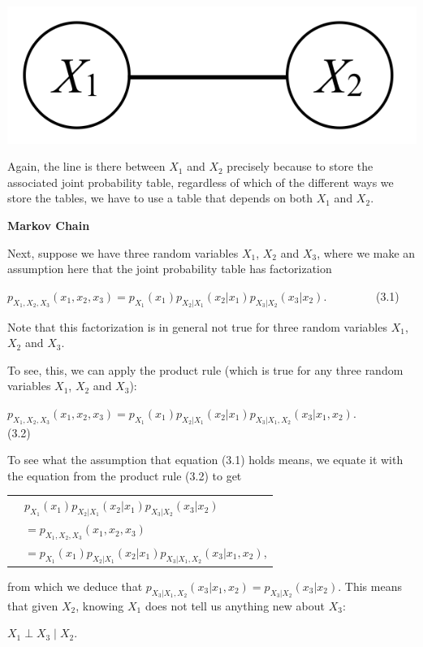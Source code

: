 \documentclass[6008notes.tex]{subfiles}
\begin{document}
{\centering\includegraphics[scale=0.4]{images_sec-graphical-models-2-rv-possibly-dependent} \par}

Again, the line is there between $X_1$ and $X_2$ precisely because to store the associated joint probability table, regardless of which of the different ways we store the tables, we have to use a table that depends on both $X_1$ and $X_2$.

\textbf{Markov Chain}

Next, suppose we have three random variables $X_1$, $X_2$ and $X_3$, where we make an assumption here that the joint probability table has factorization
{\centering$p_{X_1,X_2,X_3}(x_1,x_2,x_3) = p_{X_1}(x_1) p_{X_2|X_1}(x_2|x_1) p_{X_3|X_2}(x_3|x_2). \qquad \qquad$ (3.1) \par}

Note that this factorization is in general not true for three random variables $X_1$, $X_2$ and $X_3$.

To see, this, we can apply the product rule (which is true for any three random variables $X_1$, $X_2$ and $X_3$):
{\centering$p_{X_1,X_2,X_3}(x_1,x_2,x_3) = p_{X_1}(x_1) p_{X_2|X_1}(x_2|x_1) p_{X_3|X_1, X_2}(x_3|x_1, x_2). \qquad \qquad$ (3.2) \par}

To see what the assumption that equation (3.1) holds means, we equate it with the equation from the product rule (3.2) to get

{\renewcommand{\arraystretch}{1.5}
\begin{tabular}{l l}
 & $p_{X_1}(x_1) p_{X_2|X_1}(x_2|x_1) p_{X_3|X_2}(x_3|x_2)$ \\ 
 & $= p_{X_1,X_2,X_3}(x_1,x_2,x_3)$ \\
 & $= p_{X_1}(x_1) p_{X_2|X_1}(x_2|x_1) p_{X_3|X_1, X_2}(x_3|x_1, x_2)$,	 
\end{tabular}}
				
from which we deduce that $p_{X_3|X_1,X_2}(x_3|x_1,x_2)=p_{X_3|X_2}(x_3|x_2)$. This means that given $X_2$, knowing $X_1$ does not tell us anything new about $X_3$:
{\centering$X_1 \perp X_3 \mid X_2.$ \par}
 
\end{document}
